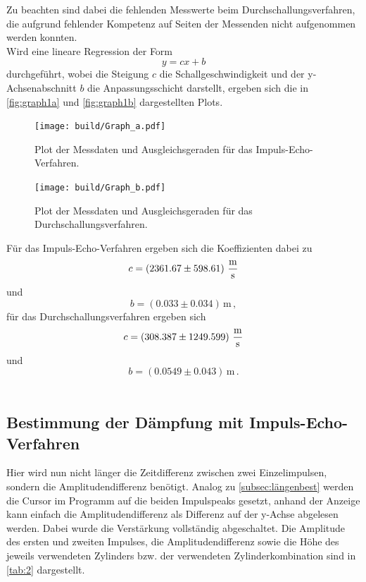 Zu beachten sind dabei die fehlenden Messwerte beim Durchschallungsverfahren, die aufgrund fehlender Kompetenz auf Seiten der Messenden nicht aufgenommen werden konnten. \\

Wird eine lineare Regression der Form
\begin{equation*}
    y = c x + b
\end{equation*}
durchgeführt, wobei die Steigung $c$ die Schallgeschwindigkeit und der y-Achsenabschnitt $b$ die Anpassungsschicht darstellt, ergeben sich die in \autoref{fig:graph1a} und \autoref{fig:graph1b} dargestellten Plots.
    
\begin{figure}[H]
        \centering
        \texttt{[image: build/Graph\_a.pdf]} 
        \caption{Plot der Messdaten und Ausgleichsgeraden für das Impuls-Echo-Verfahren.}
        \label{fig:graph1a}
\end{figure}

\begin{figure}[H]
    \centering
    \texttt{[image: build/Graph\_b.pdf]} 
    \caption{Plot der Messdaten und Ausgleichsgeraden für das Durchschallungsverfahren.}
    \label{fig:graph1b}
\end{figure}

Für das Impuls-Echo-Verfahren ergeben sich die Koeffizienten dabei zu
\begin{equation*}
    c = \left( 2361.67 \pm 598.61 \right) \,\unit{\frac{\meter}{\second}}
\end{equation*}
und
\begin{equation*}
    b = \left( 0.033 \pm 0.034 \right) \,\unit{\meter} \,,
\end{equation*}
für das Durchschallungsverfahren ergeben sich
\begin{equation*}
    c = \left( 308.387 \pm 1249.599 \right) \,\unit{\frac{\meter}{\second}}
\end{equation*}
und
\begin{equation*}
    b = \left( 0.0549 \pm 0.043 \right)\,\unit{\meter} \,.
\end{equation*} \\


\subsection{Bestimmung der Dämpfung mit Impuls-Echo-Verfahren}

Hier wird nun nicht länger die Zeitdifferenz zwischen zwei Einzelimpulsen, sondern die Amplitudendifferenz benötigt.
Analog zu \autoref{subsec:längenbest} werden die Cursor im Programm auf die beiden Impulspeaks gesetzt, anhand der Anzeige kann einfach die Amplitudendifferenz
als Differenz auf der y-Achse abgelesen werden.
Dabei wurde die Verstärkung vollständig abgeschaltet.
Die Amplitude des ersten und zweiten Impulses, die Amplitudendifferenz sowie die Höhe des jeweils verwendeten Zylinders bzw. 
der verwendeten Zylinderkombination sind in \autoref{tab:2}
dargestellt.

